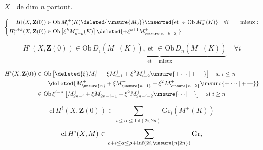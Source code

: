 $X$ \textcircled{}  de dim $n$ partout.

\[
\left\{\begin{aligned}
H^i_!(X,\mathbf{Z}(0))&\in\mathrm{Ob}\,M_i^+(K)\deleted{\unsure{M_0}}\inserted{\text{et }\in\mathrm{Ob}\,M_n^+(K)}\quad\forall i\qquad\text{mieux :}\\
H^{n+k}_!(X,\mathbf{Z}(0))&\in\mathrm{Ob}\left[\xi^{k}M_{n-k}^+(K)\right]\deleted{+\xi^{k+1}M^+_{\unsure{n-k-2}}}
\end{aligned}\right.
\]

\[
H^i(X,\mathbf{Z}(0))\in\mathrm{Ob}\,\underbrace{D_i(M^+(K)),\ \text{et }\in\mathrm{Ob}\,D_n(M^+(K))}_{\text{et }=\text{ mieux}}\quad\forall i
\]

\[
\begin{aligned}
H^i(X,\mathbf{Z}(0))&\in\mathrm{Ob}\left[\deleted{\xi}M_i^++\xi{}M_{i-1}^++\xi^{2}M_{i-2}^+\unsure{+\cdots|+\text{---}}\right]\quad\text{si }i\leq n\\
&\qquad\deleted{M^+_{\unsure{n}}+\xi{}M^+_{\unsure{n-1}}+\xi^{2}M^+_{\unsure{n-2}}\unsure{+\cdots|+\text{---}}}\\
&\in\mathrm{Ob}\,\xi^{i-n}\left[M^+_{2n-i}+\xi{}M^+_{2n-i-1}+\xi^{2}M^+_{2n-i-2}\unsure{\cdots|\text{---}}\right]\quad\text{si }i\geq n
\end{aligned}
\]

\[
\mathrm{cl}\,H^i(X,\mathbf{Z}(0))\in\sum_{i\leq\alpha\leq\mathrm{Inf}(2i,2n)}\mathrm{Gr}_{i}(M^+(K))
\]
\[
\mathrm{cl}\,H^i(X,M)\in\sum_{\rho+i\leq\alpha\leq\rho+\mathrm{Inf}(2i,\unsure{n|2n})}\mathrm{Gr}_{i}
\]
